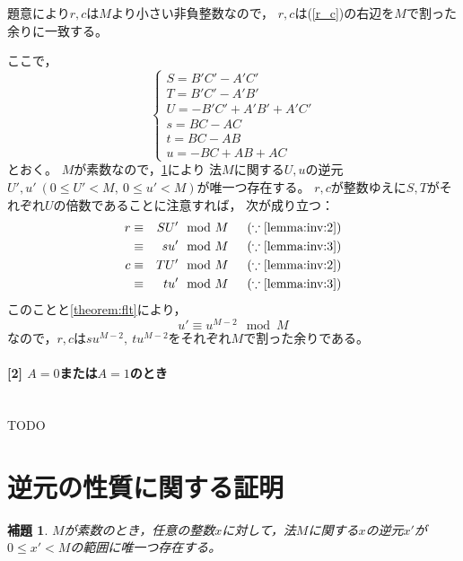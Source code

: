 \documentclass{article}
\makeatletter
\renewenvironment{proof}[1][\proofname]{\par
    \pushQED{\qed}
    \normalfont
    \topsep6\p@\@plus6\p@ \trivlist
    \item[\hskip\labelsep{\bfseries #1}\@addpunct{\bfseries}]\ignorespaces
}{%
    \popQED\endtrivlist\@endpefalse
}
\renewcommand{\proofname}{証明.}
\newtheorem{lemma}{補題}
\newcommand{\myparagraph}[1]{\paragraph{#1}\mbox{}\\}
\makeatother
\begin{document}
\begin{proof}
    題意により$r, c$は$M$より小さい非負整数なので，
    $r, c$は(\ref{r_c})の右辺を$M$で割った余りに一致する。

    ここで，
    \begin{equation*}
        \begin{cases}
            S = B'C' - A'C' \\
            T = B'C' - A'B' \\
            U = -B'C' + A'B' + A'C' \\
            s = BC - AC \\
            t = BC - AB \\
            u = -BC + AB + AC
        \end{cases}
    \end{equation*}
    とおく。
    $M$が素数なので，\cref{lemma:inv:1}により
    法$M$に関する$U, u$の逆元$U', u'\ (0 \leq U' < M,\ 0 \leq u' < M)$が唯一つ存在する。
    $r, c$が整数ゆえに$S, T$がそれぞれ$U$の倍数であることに注意すれば，
    次が成り立つ：
    \begin{eqnarray*}
        r &\equiv& SU' \mod{M} \hspace{15pt} (\because \mbox{\cref{lemma:inv:2}}) \\
          &\equiv& su' \mod{M} \hspace{15pt} (\because \mbox{\cref{lemma:inv:3}}) \\
        c &\equiv& TU' \mod{M} \hspace{15pt} (\because \mbox{\cref{lemma:inv:2}}) \\
          &\equiv& tu' \mod{M} \hspace{15pt} (\because \mbox{\cref{lemma:inv:3}})
    \end{eqnarray*}
    このことと\cref{theorem:flt}により，
    \begin{equation*}
        u' \equiv u^{M - 2} \mod{M}
    \end{equation*}
    なので，$r, c$は$su^{M - 2},\ tu^{M - 2}$をそれぞれ$M$で割った余りである。

    \myparagraph{[2] $A = 0$または$A = 1$のとき}

    TODO
\end{proof}



\section{逆元の性質に関する証明}

\begin{screen}
    \begin{lemma}
        \label{lemma:inv:1}
        $M$が素数のとき，任意の整数$x$に対して，法$M$に関する$x$の逆元$x'$が$0 \leq x' < M$の範囲に唯一つ存在する。
    \end{lemma}
\end{screen}
\end{document}
